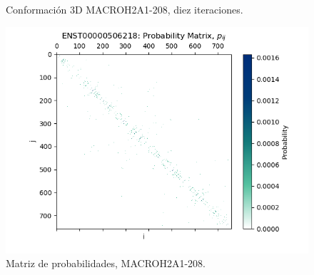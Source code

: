 \documentclass[a4paper,11pt,titlepage]{article}
\theoremstyle{definition}
\begin{document}
\begin{figure}[H]
\begin{minipage}[c]{0.31\textwidth}
        \caption{Conformación 3D MACROH2A1-208, diez iteraciones.}
        \label{fig:MACROH2A1-208-multi}
    \end{minipage}
    \hfill
    \begin{minipage}[c]{0.31\textwidth}
        \centering
        \includegraphics[width=\textwidth]{images/MACROH2A1-208-db_iter-matrix.png}
        \caption{Matriz de probabilidades, MACROH2A1-208.}
        \label{fig:MACROH2A1-208-matrix}
    \end{minipage}
\end{figure}
\end{document}
